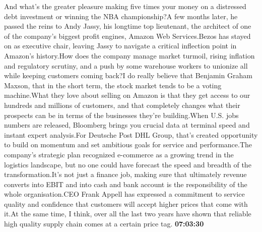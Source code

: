 \documentclass{article}%
\begin{document}
And what's the greater pleasure making five times your money on a distressed debt investment or winning the NBA championship?A few months later, he passed the reins to Andy Jassy, his longtime top lieutenant, the architect of one of the company's biggest profit engines, Amazon Web Services.Bezos has stayed on as executive chair, leaving Jassy to navigate a critical inflection point in Amazon's history.How does the company manage market turmoil, rising inflation and regulatory scrutiny, and a push by some warehouse workers to unionize all while keeping customers coming back?I do really believe that Benjamin Graham Maxson, that in the short term, the stock market tends to be a voting machine.What they love about selling on Amazon is that they get access to our hundreds and millions of customers, and that completely changes what their prospects can be in terms of the businesses they're building.When U.S. jobs numbers are released, Bloomberg brings you crucial data at terminal speed and instant expert analysis.For Deutsche Post DHL Group, that's created opportunity to build on momentum and set ambitious goals for service and performance.The company's strategic plan recognized e{-}commerce as a growing trend in the logistics landscape, but no one could have forecast the speed and breadth of the transformation.It's not just a finance job, making sure that ultimately revenue converts into EBIT and into cash and bank account is the responsibility of the whole organisation.CEO Frank Appell has expressed a commitment to service quality and confidence that customers will accept higher prices that come with it.At the same time, I think, over all the last two years have shown that reliable high quality supply chain comes at a certain price tag.%
\textbf{07:03:30}%
\newline%
\end{document}
